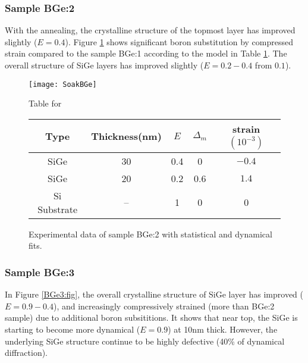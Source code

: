 \subsubsection{Sample BGe:2}

With the annealing, the crystalline structure of the topmost layer has improved slightly ($E=0.4$). Figure \ref{BGe2:fig} shows significant boron substitution by compressed strain compared to the sample BGe:1 according to the model in Table \ref{BGe2:fig}.  The overall structure of SiGe layers has improved slightly ($E=0.2-0.4$ from $ 0.1$).

\begin{figure}[ht]%
\caption{Experimental data of sample BGe:2 with statistical and dynamical fits.}
\label{BGe2:fig}
\begin{minipage}{\linewidth}
\texttt{[image: SoakBGe]}
\end{minipage}
\begin{minipage}{\linewidth}
\centering
\vspace{10pt}
Table for \\
\begin{tabular}[htbp]{@{}c|cccc@{}}
    \hline
  Type & Thickness(nm) & $E$ & $\Delta_m$ & strain $(10^{-3})$ \\
    \hline
  SiGe & 30 & 0.4 & 0 & $-0.4 $  \\
  SiGe & 20 & 0.2 & 0.6 & $1.4 $  \\
  Si Substrate & -- & 1 & 0 & 0 
  \end{tabular}
\end{minipage}
\end{figure}

\subsubsection{Sample BGe:3}

In Figure \ref{BGe3:fig}, the overall crystalline structure of SiGe layer has improved ($E=0.9-0.4$), and increasingly compressively strained (more than BGe:2 sample) due to additional boron subsititions.  It shows that near top, the SiGe is starting to become more dynamical ($E=0.9$) at 10nm thick.  However, the underlying SiGe structure continue to be highly defective (40\% of dynamical diffraction).  

